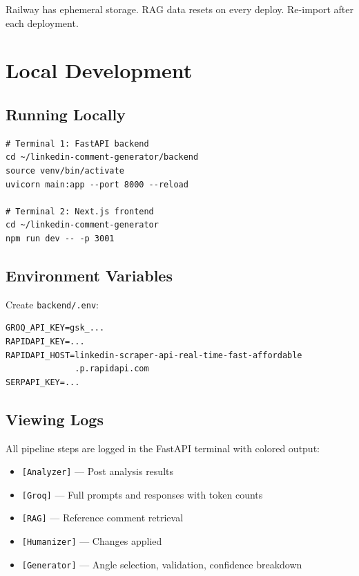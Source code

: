 \documentclass[12pt,a4paper]{article}
\begin{document}
\begin{warnbox}
Railway has ephemeral storage. RAG data resets on every deploy. Re-import after each deployment.
\end{warnbox}

\section{Local Development}

\subsection{Running Locally}

\begin{verbatim}
# Terminal 1: FastAPI backend
cd ~/linkedin-comment-generator/backend
source venv/bin/activate
uvicorn main:app --port 8000 --reload

# Terminal 2: Next.js frontend
cd ~/linkedin-comment-generator
npm run dev -- -p 3001
\end{verbatim}

\subsection{Environment Variables}

Create \texttt{backend/.env}:
\begin{verbatim}
GROQ_API_KEY=gsk_...
RAPIDAPI_KEY=...
RAPIDAPI_HOST=linkedin-scraper-api-real-time-fast-affordable
              .p.rapidapi.com
SERPAPI_KEY=...
\end{verbatim}

\subsection{Viewing Logs}
All pipeline steps are logged in the FastAPI terminal with colored output:
\begin{itemize}[leftmargin=1.5em]
    \item \texttt{[Analyzer]} --- Post analysis results
    \item \texttt{[Groq]} --- Full prompts and responses with token counts
    \item \texttt{[RAG]} --- Reference comment retrieval
    \item \texttt{[Humanizer]} --- Changes applied
    \item \texttt{[Generator]} --- Angle selection, validation, confidence breakdown
\end{itemize}
\end{document}
